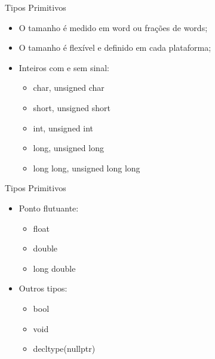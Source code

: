 \documentclass[12pt,table,xcolor={dvipsnames}]{beamer}
\begin{document}
\begin{frame}[fragile]{Tipos Primitivos}
\begin{itemize}
\item O tamanho é medido em word ou frações de words;
\item O tamanho é flexível e definido em cada plataforma;
\item Inteiros com e sem sinal:
\begin{itemize}
\item char, unsigned char
\item short, unsigned short
\item int, unsigned int
\item long, unsigned long
\item long long, unsigned long long
\end{itemize}
\end{itemize}
\end{frame}

\begin{frame}[fragile]{Tipos Primitivos}
\begin{itemize}
\item Ponto flutuante:
\begin{itemize}
\item float
\item double
\item long double
\end{itemize}
\item Outros tipos:
\begin{itemize}
\item bool
\item void
\item decltype(nullptr)
\end{itemize}
\end{itemize}
\end{frame}
\end{document}
